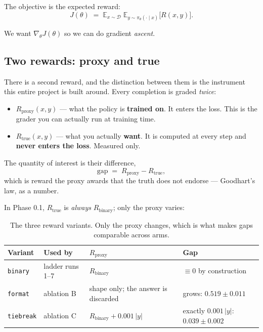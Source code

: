 \documentclass[11pt,letterpaper]{article}
\theoremstyle{definition}
\newcommand{\E}{\mathbb{E}}
\newcommand{\pol}{\pi_\theta}
\newcommand{\grad}{\nabla_\theta}
\begin{document}
The objective is the expected reward:
\begin{equation}
  J(\theta) \;=\; \E_{x \sim \mathcal{D}} \; \E_{y \sim \pol(\cdot \mid x)} \big[ R(x, y) \big].
  \label{eq:objective}
\end{equation}

We want $\grad J(\theta)$ so we can do gradient \emph{ascent}.

\subsection{Two rewards: proxy and true}
\label{sec:proxytrue}

There is a second reward, and the distinction between them is the instrument this entire project is
built around. Every completion is graded \emph{twice}:

\begin{itemize}
  \item $R_{\text{proxy}}(x,y)$ --- what the policy is \textbf{trained on}. It enters the loss. This
        is the grader you can actually run at training time.
  \item $R_{\text{true}}(x,y)$ --- what you actually \textbf{want}. It is computed at every step and
        \textbf{never enters the loss}. Measured only.
\end{itemize}

The quantity of interest is their difference,
\begin{equation}
  \mathrm{gap} \;=\; R_{\text{proxy}} - R_{\text{true}},
  \label{eq:gap}
\end{equation}
which is reward the proxy awards that the truth does not endorse --- Goodhart's law, as a number.

In Phase 0.1, $R_{\text{true}}$ is \emph{always} $R_{\text{binary}}$; only the proxy varies:

\begin{table}[H]
\centering
\caption{The three reward variants. Only the proxy changes, which is what makes gaps comparable
across arms.}
\label{tab:variants}
\small
\begin{tabular}{@{}llll@{}}
\toprule
\textbf{Variant} & \textbf{Used by} & \textbf{$R_{\text{proxy}}$} & \textbf{Gap} \\
\midrule
\texttt{binary}   & ladder runs 1--7 & $R_{\text{binary}}$ & $\equiv 0$ by construction \\
\texttt{format}   & ablation B & shape only; the answer is discarded & grows: $0.519 \pm 0.011$ \\
\texttt{tiebreak} & ablation C & $R_{\text{binary}} + 0.001\,|y|$ & exactly $0.001\,|y|$: $0.039 \pm 0.002$ \\
\bottomrule
\end{tabular}
\end{table}
\end{document}
